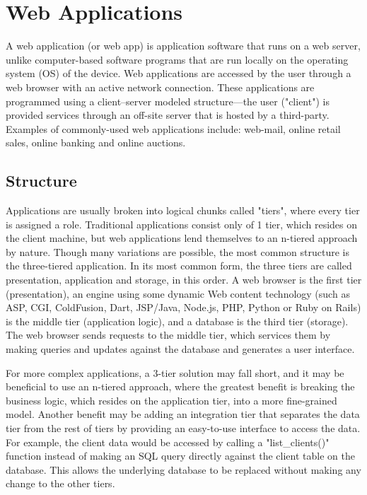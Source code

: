 \section{Web Applications}

A web application (or web app) is application software that runs on a web server, unlike computer-based software programs that are run locally on the operating system (OS) of the device. Web applications are accessed by the user through a web browser with an active network connection. These applications are programmed using a client–server modeled structure—the user ("client") is provided services through an off-site server that is hosted by a third-party. Examples of commonly-used web applications include: web-mail, online retail sales, online banking and online auctions.

\subsection{Structure}

Applications are usually broken into logical chunks called "tiers", where every tier is assigned a role. Traditional applications consist only of 1 tier, which resides on the client machine, but web applications lend themselves to an n-tiered approach by nature. Though many variations are possible, the most common structure is the three-tiered application.\cite{krunalMakeNtierArchitecture2008} In its most common form, the three tiers are called presentation, application and storage, in this order. A web browser is the first tier (presentation), an engine using some dynamic Web content technology (such as ASP, CGI, ColdFusion, Dart, JSP/Java, Node.js, PHP, Python or Ruby on Rails) is the middle tier (application logic), and a database is the third tier (storage). The web browser sends requests to the middle tier, which services them by making queries and updates against the database and generates a user interface.

For more complex applications, a 3-tier solution may fall short, and it may be beneficial to use an n-tiered approach, where the greatest benefit is breaking the business logic, which resides on the application tier, into a more fine-grained model.\cite{krunalMakeNtierArchitecture2008} Another benefit may be adding an integration tier that separates the data tier from the rest of tiers by providing an easy-to-use interface to access the data. For example, the client data would be accessed by calling a "list\_clients()" function instead of making an SQL query directly against the client table on the database. This allows the underlying database to be replaced without making any change to the other tiers.


